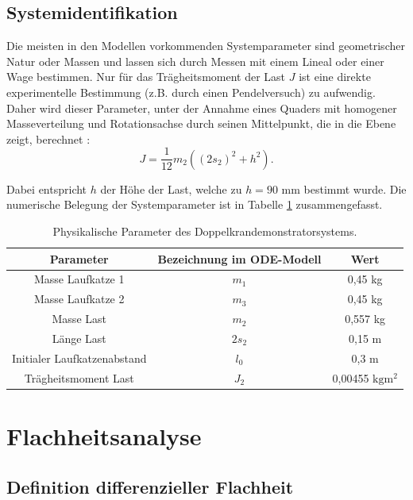 \section{Systemidentifikation}
\label{sec:SysIdent}

Die meisten in den Modellen vorkommenden Systemparameter sind geometrischer Natur oder Massen und lassen sich durch Messen mit einem Lineal oder einer Wage bestimmen. Nur für das Trägheitsmoment der Last $J$ ist eine direkte experimentelle Bestimmung (z.B. durch einen Pendelversuch) zu aufwendig. Daher wird dieser Parameter, unter der Annahme eines Quaders mit homogener Masseverteilung und Rotationsachse durch seinen Mittelpunkt, die in die Ebene zeigt, berechnet \cite{LastTraegheit}:
\begin{equation}
	J = \frac{1}{12} m_2 ((2 s_2)^2 + h^2).
\end{equation}

Dabei entspricht $h$ der Höhe der Last, welche zu $h = 90$ mm
bestimmt wurde. Die numerische Belegung der Systemparameter ist in Tabelle \ref{tab:sys_params} zusammengefasst.

\begin{table}[htbp]%
	\centering
	\caption{Physikalische Parameter des Doppelkrandemonstratorsystems.}
	\label{tab:sys_params}
	\begin{tabular}{c c c} 
		Parameter & Bezeichnung im ODE-Modell & Wert \\ 
		\hline
		Masse Laufkatze 1 & $m_1$ & 0,45 \si{\kg} \\
		Masse Laufkatze 2 & $m_3$ & 0,45 \si{\kg} \\
 		Masse Last & $m_2$ & 0,557 \si{\kg} \\
		Länge Last & $2 s_2$ & 0,15 \si{\m} \\
		Initialer Laufkatzenabstand & $l_0$ & 0,3 \si{\m} \\
		Trägheitsmoment Last & $J_2$ & 0,00455 $\si{\kg\m^2}$ \\
		\bottomrule
	\end{tabular}
\end{table}

\chapter{Flachheitsanalyse}

\section{Definition differenzieller Flachheit}\label{sec:Def_flatness}

